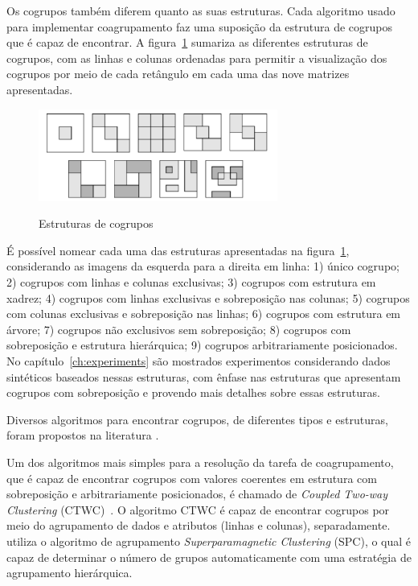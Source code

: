 \documentclass[
    12pt,                %
    oneside,            %
    a4paper,            %
    english,            %
    brazil                %
    ]{abntex2ppgsi}
\begin{document}
Os cogrupos também diferem quanto as suas estruturas.
Cada algoritmo usado para implementar coagrupamento faz uma suposição da estrutura de cogrupos que é capaz de encontrar.
A figura~\ref{fig:bicstruct} sumariza as diferentes estruturas de cogrupos, com as linhas e colunas ordenadas para permitir a visualização dos cogrupos por meio de cada retângulo em cada uma das nove matrizes apresentadas.

\begin{figure}[H]
\centering
    \caption{Estruturas de cogrupos}
    \includegraphics[width=0.7\textwidth]{img/synteticBiclusters.png}
    \label{fig:bicstruct}
\end{figure}

É possível nomear cada uma das estruturas apresentadas na figura~\ref{fig:bicstruct}, considerando as imagens da esquerda para a direita em linha: 1) único cogrupo; 2) cogrupos com linhas e colunas exclusivas; 3) cogrupos com estrutura em xadrez; 4) cogrupos com linhas exclusivas e sobreposição nas colunas; 5) cogrupos com colunas exclusivas e sobreposição nas linhas; 6) cogrupos com estrutura em árvore; 7) cogrupos não exclusivos sem sobreposição; 8) cogrupos com sobreposição e estrutura hierárquica; 9) cogrupos arbitrariamente posicionados.
No capítulo~\ref{ch:experiments} são mostrados experimentos considerando dados sintéticos baseados nessas estruturas, com ênfase nas estruturas que apresentam cogrupos com sobreposição e provendo mais detalhes sobre essas estruturas.

Diversos algoritmos para encontrar cogrupos, de diferentes tipos e estruturas, foram propostos na literatura \cite{Tanay2005,Madeira2004}.

Um dos algoritmos mais simples para a resolução da tarefa de coagrupamento, que é capaz de encontrar cogrupos com valores coerentes em estrutura com sobreposição e arbitrariamente posicionados, é chamado de \textit{Coupled Two-way Clustering} (CTWC)~\cite{Getz2000}.
O algoritmo CTWC é capaz de encontrar cogrupos por meio do agrupamento de dados e atributos (linhas e colunas), separadamente.
 utiliza o algoritmo de agrupamento \textit{Superparamagnetic Clustering} (SPC), o qual é capaz de determinar o número de grupos automaticamente com uma estratégia de agrupamento hierárquica.
\end{document}
